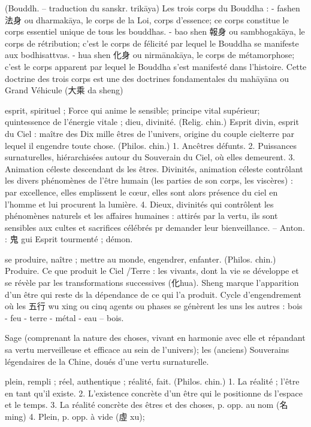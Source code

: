    

\begin{Def}[sanshen 三身]
    (Bouddh. – traduction du sanskr. trikāya)	Les trois corps du Bouddha :	- fashen 法身 ou dharmakāya, le corps de la Loi, corps d’essence; ce corps constitue le corps essentiel unique de tous les bouddhas. - bao shen 報身 ou sambhogakāya, le corps de rétribution; c’est le corps de félicité par lequel le Bouddha se manifeste aux bodhisattvas. - hua shen 化身 ou nirmānakāya, le corps de métamorphose; c’est le corps apparent par lequel le Bouddha s’est manifesté dans l’histoire. 
    Cette doctrine des trois corps est une des doctrines fondamentales du mahāyāna ou Grand Véhicule (大乘 da sheng) 
\end{Def}
\begin{Def}[shen 神 ]
    esprit, spirituel ; Force qui anime le sensible; principe vital supérieur; quintessence de l’énergie vitale ; dieu, divinité. (Relig. chin.)     Esprit divin, esprit du Ciel : maître des Dix mille êtres de l’univers, origine du couple cielterre par lequel il engendre toute chose. (Philos. chin.) 1. Ancêtres défunts. 2. Puissances surnaturelles, hiérarchisées autour du Souverain du Ciel, où elles demeurent. 3. Animation céleste descendant ds les êtres. Divinités, animation céleste contrôlant les divers phénomènes de l’être humain (les parties de son corps, les viscères) : par excellence, elles emplissent le cœur, elles sont alors présence du ciel en l’homme et lui procurent la lumière. 4. Dieux, divinités qui contrôlent les phénomènes naturels et les affaires humaines : attirés par la vertu, ils sont sensibles aux cultes et sacrifices célébrés pr demander leur bienveillance. – Anton. : 鬼 gui Esprit tourmenté ; démon. 
\end{Def}
\begin{Def}[sheng 生]
     se produire, naître ; mettre au monde, engendrer, enfanter.     (Philos. chin.) Produire. Ce que produit le Ciel /Terre : les vivants, dont la vie se développe et se révèle par les transformations successives (化hua). Sheng marque l’apparition d’un être qui reste ds la dépendance de ce qui l’a produit.     Cycle d’engendrement où les 五行 wu xing ou cinq agents ou phases se génèrent les uns les autres : bois - feu - terre - métal - eau – bois. 
\end{Def}
\begin{Def}[sheng 聖]
    Sage (comprenant la nature des choses, vivant en harmonie avec elle et répandant sa vertu merveilleuse et efficace au sein de l’univers); les (anciens) Souverains légendaires de la Chine, doués d’une vertu surnaturelle.	
\end{Def}
\begin{Def}[shi 實 ]
    plein, rempli ; réel, authentique ; réalité, fait. (Philos. chin.) 1. La réalité ; l’être en tant qu’il existe. 2. L’existence concrète d’un être qui le positionne ds l’espace et le temps. 3. La réalité concrète des êtres et des choses, p. opp. au nom (名 ming) 4. Plein, p. opp. à vide (虛 xu); 
\end{Def}

